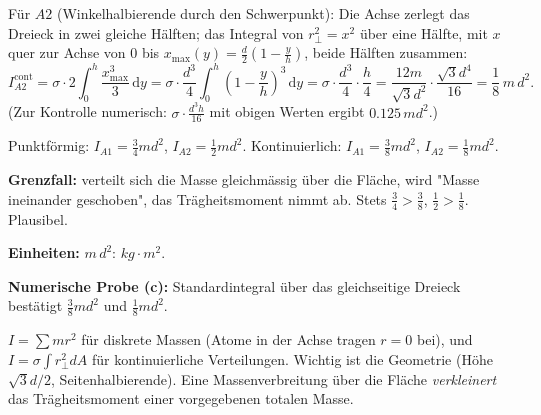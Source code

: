Für $A2$ (Winkelhalbierende durch den Schwerpunkt): Die Achse zerlegt das
Dreieck in zwei gleiche Hälften; das Integral von $r_\perp^2=x^2$ über eine
Hälfte, mit $x$ quer zur Achse von $0$ bis $x_\mathrm{max}(y)=
\frac d2(1-\frac yh)$, beide Hälften zusammen:
\begin{equation}
  I_{A2}^{\mathrm{cont}}
  = \sigma\cdot 2\int_0^h \frac{x_\mathrm{max}^3}{3}\,\mathrm dy
  = \sigma \cdot \frac{d^3}{4}\int_0^h \left(1-\frac yh\right)^3\frac{}{}\mathrm dy
  = \sigma \cdot \frac{d^3}{4}\cdot\frac h4
  = \frac{12m}{\sqrt3 d^2}\cdot\frac{\sqrt3 d^4}{16}
  = \frac18\, m\, d^2.
\end{equation}
(Zur Kontrolle numerisch: $\sigma\cdot\frac{d^3 h}{16}$ mit obigen Werten ergibt
$0.125\,m d^2$.) \checkmark

\begin{ergebnis}
Punktförmig: $I_{A1}=\frac34 m d^2$, $I_{A2}=\frac12 m d^2$.
Kontinuierlich: $I_{A1}=\frac38 m d^2$, $I_{A2}=\frac18 m d^2$.
\end{ergebnis}

\begin{kontrolle}
\textbf{Grenzfall:} verteilt sich die Masse gleichmässig über die Fläche, wird
"Masse ineinander geschoben", das Trägheitsmoment nimmt ab. Stets
$\frac34>\frac38$, $\frac12>\frac18$. Plausibel.

\textbf{Einheiten:} $m\,d^2$: $kg\cdot m^2$. \checkmark

\textbf{Numerische Probe (c):} Standardintegral über das gleichseitige Dreieck
bestätigt $\frac38 m d^2$ und $\frac18 m d^2$. \checkmark
\end{kontrolle}

\begin{merksatz}
$I=\sum m r^2$ für diskrete Massen (Atome in der Achse tragen $r=0$ bei), und
$I=\sigma\int r_\perp^2 dA$ für kontinuierliche Verteilungen. Wichtig ist die
Geometrie (Höhe $\sqrt3 d/2$, Seitenhalbierende). Eine Massenverbreitung über
die Fläche \emph{verkleinert} das Trägheitsmoment einer vorgegebenen totalen
Masse.
\end{merksatz}